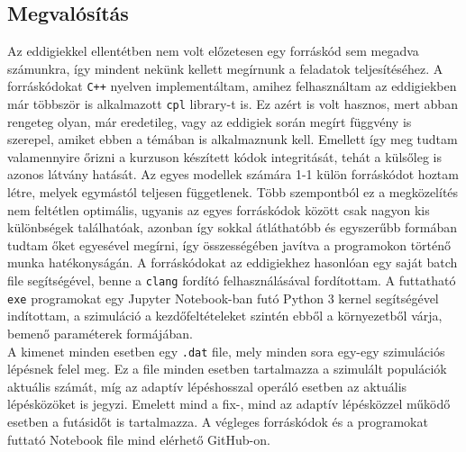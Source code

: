 \begin{multicols}{2}
\section{Megvalósítás} \label{sec:4}
Az eddigiekkel ellentétben nem volt előzetesen egy forráskód sem megadva számunkra, így mindent nekünk kellett megírnunk a feladatok teljesítéséhez. A forráskódokat \texttt{C++} nyelven implementáltam, amihez felhasználtam az eddigiekben már többször is alkalmazott \texttt{cpl} library-t is. Ez azért is volt hasznos, mert abban rengeteg olyan, már eredetileg, vagy az eddigiek során megírt függvény is szerepel, amiket ebben a témában is alkalmaznunk kell. Emellett így meg tudtam valamennyire őrizni a kurzuson készített kódok integritását, tehát a külsőleg is azonos látvány hatását. Az egyes modellek számára 1-1 külön forráskódot hoztam létre, melyek egymástól teljesen függetlenek. Több szempontból ez a megközelítés nem feltétlen optimális, ugyanis az egyes forráskódok között csak nagyon kis különbségek találhatóak, azonban így sokkal átláthatóbb és egyszerűbb formában tudtam őket egyesével megírni, így összességében javítva a programokon történő munka hatékonyságán. A forráskódokat az eddigiekhez hasonlóan egy saját batch file segítségével, benne a \texttt{clang} fordító felhasználásával fordítottam. A futtatható \texttt{exe} programokat egy Jupyter Notebook-ban futó Python 3 kernel segítségével indítottam, a szimuláció a kezdőfeltételeket szintén ebből a környezetből várja, bemenő paraméterek formájában. \\
A kimenet minden esetben egy \texttt{.dat} file, mely minden sora egy-egy szimulációs lépésnek felel meg. Ez a file minden esetben tartalmazza a szimulált populációk aktuális számát, míg az adaptív lépéshosszal operáló esetben az aktuális lépésközöket is jegyzi. Emelett mind a fix-, mind az adaptív lépésközzel működő esetben a futásidőt is tartalmazza. A végleges forráskódok és a programokat futtató Notebook file mind elérhető GitHub-on\cite{github}.


\end{multicols}
